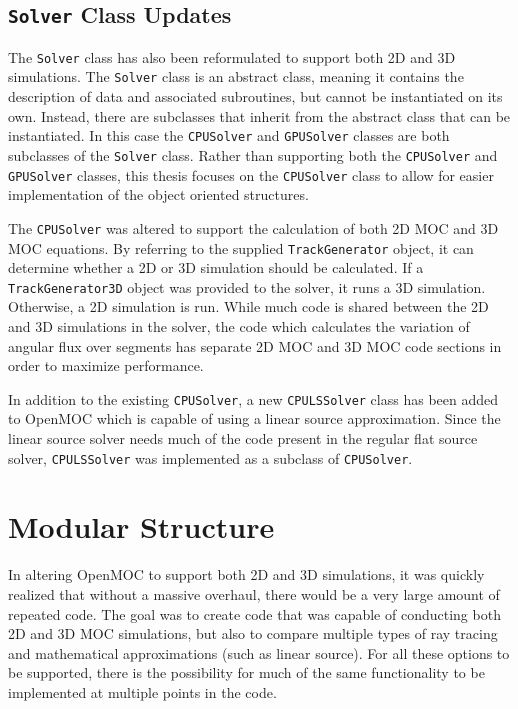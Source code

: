 \subsection{\texttt{Solver} Class Updates}
\label{sec:oo-solver}

The \texttt{Solver} class has also been reformulated to support both 2D and 3D simulations. The \texttt{Solver} class is an abstract class, meaning it contains the description of data and associated subroutines, but cannot be instantiated on its own. Instead, there are subclasses that inherit from the abstract class that can be instantiated. In this case the \texttt{CPUSolver} and \texttt{GPUSolver} classes are both subclasses of the \texttt{Solver} class. Rather than supporting both the \texttt{CPUSolver} and \texttt{GPUSolver} classes, this thesis focuses on the \texttt{CPUSolver} class to allow for easier implementation of the object oriented structures.

The \texttt{CPUSolver} was altered to support the calculation of both 2D \ac{MOC} and 3D \ac{MOC} equations. By referring to the supplied \texttt{TrackGenerator} object, it can determine whether a 2D or 3D simulation should be calculated. If a \texttt{TrackGenerator3D} object was provided to the solver, it runs a 3D simulation. Otherwise, a 2D simulation is run. While much code is shared between the 2D and 3D simulations in the solver, the code which calculates the variation of angular flux over segments has separate 2D \ac{MOC} and 3D \ac{MOC} code sections in order to maximize performance.

In addition to the existing \texttt{CPUSolver}, a new \texttt{CPULSSolver} class has been added to OpenMOC which is capable of using a linear source approximation. Since the linear source solver needs much of the code present in the regular flat source solver, \texttt{CPULSSolver} was implemented as a subclass of \texttt{CPUSolver}.

\section{Modular Structure}
\label{sec:modular-structure}

In altering OpenMOC to support both 2D and 3D simulations, it was quickly realized that without a massive overhaul, there would be a very large amount of repeated code. The goal was to create code that was capable of conducting both 2D and 3D \ac{MOC} simulations, but also to compare multiple types of ray tracing and mathematical approximations (such as linear source). For all these options to be supported, there is the possibility for much of the same functionality to be implemented at multiple points in the code.

